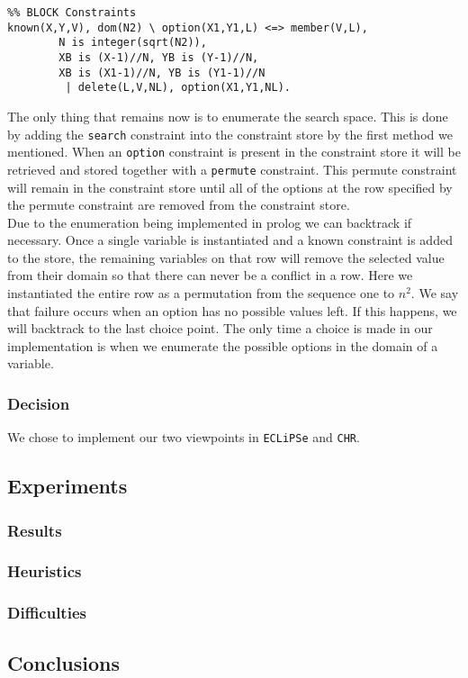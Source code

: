\begin{lstlisting}
%% BLOCK Constraints
known(X,Y,V), dom(N2) \ option(X1,Y1,L) <=> member(V,L),
        N is integer(sqrt(N2)),
        XB is (X-1)//N, YB is (Y-1)//N,
        XB is (X1-1)//N, YB is (Y1-1)//N
         | delete(L,V,NL), option(X1,Y1,NL).
\end{lstlisting}

The only thing that remains now is to enumerate the search space. 
This is done by adding the \texttt{search} constraint into the constraint store by the first method we mentioned.
When an \texttt{option} constraint is present in the constraint store it will be retrieved and stored together with a \texttt{permute} constraint. 
This permute constraint will remain in the constraint store until all of the options at the row specified by the permute constraint are removed from the constraint store. \\

Due to the enumeration being implemented in prolog we can backtrack if necessary.
Once a single variable is instantiated and a known constraint is added to the store, the remaining variables on that row will remove the selected value from their domain so that there can never be a conflict in a row.
Here we instantiated the entire row as a permutation from the sequence one to $n^2$. 
We say that failure occurs when an option has no possible values left.
If this happens, we will backtrack to the last choice point. 
The only time a choice is made in our implementation is when we enumerate the possible options in the domain of a variable.

\subsubsection{Decision}
We chose to implement our two viewpoints in \texttt{ECLiPSe} and \texttt{CHR}.

\newpage
\subsection{Experiments}\label{subsec:sudokuexperiments}
\subsubsection{Results}
\subsubsection{Heuristics}
\subsubsection{Difficulties}

\subsection{Conclusions}


